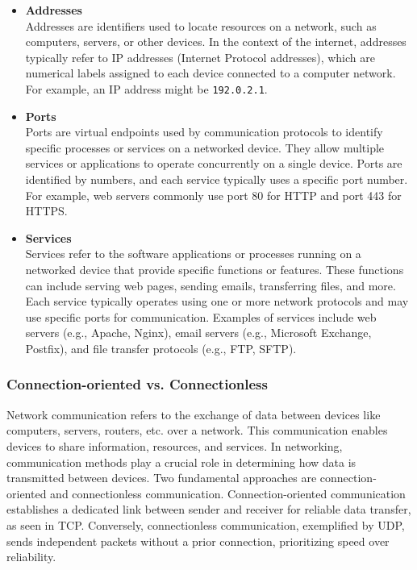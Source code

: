 \begin{itemize}
    \item \textbf{Addresses}\\
    Addresses are identifiers used to locate resources on a network, such as computers, servers, or other devices. In the context of the internet, addresses typically refer to IP addresses (Internet Protocol addresses), which are numerical labels assigned to each device connected to a computer network. For example, an IP address might be \texttt{192.0.2.1}.
    
    \item \textbf{Ports}\\
    Ports are virtual endpoints used by communication protocols to identify specific processes or services on a networked device. They allow multiple services or applications to operate concurrently on a single device. Ports are identified by numbers, and each service typically uses a specific port number. For example, web servers commonly use port 80 for HTTP and port 443 for HTTPS.
    
    \item \textbf{Services}\\
    Services refer to the software applications or processes running on a networked device that provide specific functions or features. These functions can include serving web pages, sending emails, transferring files, and more. Each service typically operates using one or more network protocols and may use specific ports for communication. Examples of services include web servers (e.g., Apache, Nginx), email servers (e.g., Microsoft Exchange, Postfix), and file transfer protocols (e.g., FTP, SFTP).
\end{itemize}

\newpage 

\subsubsection{Connection-oriented vs. Connectionless}
Network communication refers to the exchange of data between devices like computers, servers, routers, etc. over a network. This communication enables devices to share information, resources, and services. In networking, communication methods play a crucial role in determining how data is transmitted between devices. Two fundamental approaches are connection-oriented and connectionless communication. Connection-oriented communication establishes a dedicated link between sender and receiver for reliable data transfer, as seen in TCP. Conversely, connectionless communication, exemplified by UDP, sends independent packets without a prior connection, prioritizing speed over reliability.

